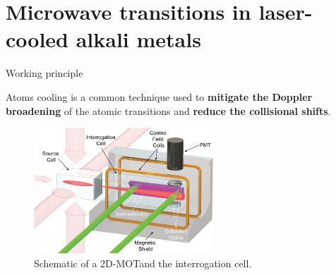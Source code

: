 \section*{Microwave transitions in laser-cooled alkali metals}

\begin{frame}{Working principle}

    Atoms cooling is a common technique used to \textbf{mitigate the Doppler broadening} of the atomic transitions and \textbf{reduce the collisional shifts}.

    \begin{figure}
        \centering
        \includegraphics[width=0.6\textwidth]{img/laser-cooled-alkali-metals-trapping.png}
        \caption{Schematic of a 2D-MOT\footnotemark[1] and the interrogation cell.}
    \end{figure}


\end{frame}



